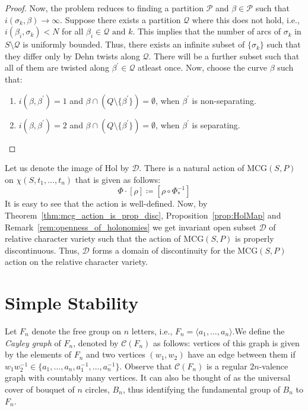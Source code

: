 \begin{proof}
	Now, the problem reduces to finding a partition $\mathcal{P}$ and $\beta \in \mathcal{P}$ such that $i(\sigma_k, \beta) \rightarrow \infty$. Suppose there exists a partition $\mathcal{Q}$ where this does not hold, i.e., $i(\beta_i,\sigma_k) < N$ for all $\beta_i \in \mathcal{Q} \text{ and } k$. This implies that the number of arcs of $\sigma_k$ in $S \setminus \mathcal{Q}$ is uniformly bounded. Thus, there exists an infinite subset of $\{\sigma_k\}$ such that they differ only by Dehn twists along $\mathcal{Q}$. There will be a further subset such that all of them are twisted along $\beta^\prime \in \mathcal{Q}$ atleast once. Now, choose the curve $\beta$ such that:
	\begin{enumerate}
		\item $i(\beta, \beta^\prime)=1$ and $\beta \cap \left(Q \setminus \{\beta^\prime\}\right) = \emptyset$, when $\beta^\prime$ is non-separating.
		\item $i(\beta, \beta^\prime)=2$ and $\beta \cap \left(Q \setminus \{\beta^\prime\}\right) = \emptyset$, when $\beta^\prime$ is separating.
	\end{enumerate}
\end{proof}

Let us denote the image of $\text{Hol}$ by $\mathcal{D}$. There is a natural action of $\text{MCG}(S,P)$ on $\chi(S,t_1,\ldots,t_n)$ that is given as follows:
\[\Phi \cdot [\rho] \coloneqq [\rho \circ \Phi_\ast^{-1}]\]
It is easy to see that the action is well-defined. Now, by Theorem~\ref{thm:mcg_action_is_prop_disc}, Proposition~\ref{prop:HolMap} and Remark~\ref{rem:openness_of_holonomies} we get invariant open subset $\mathcal{D}$ of relative character variety such that the action of $\text{MCG}(S,P)$ is properly discontinuous. Thus, $\mathcal{D}$ forms a domain of discontinuity for the $\text{MCG}(S,P)$ action on the relative character variety. 

\section{Simple Stability}

Let $F_n$ denote the free group on $n$ letters, i.e., $F_n = \langle a_1, \ldots, a_n \rangle$.We define the \textit{Cayley graph} of $F_n$, denoted by $\mathcal{C}(F_n)$ as follows: vertices of this graph is given by the elements of $F_n$ and two vertices $(w_1, w_2)$ have an edge between them if $w_1 w_2^{-1} \in \{a_1, \ldots,a_n,a_1^{-1},\ldots,a_n^{-1}\}$. Observe that $\mathcal{C}(F_n)$ is a regular $2n$-valence graph with countably many vertices. It can also be thought of as the universal cover of bouquet of $n$ circles, $B_n$, thus identifying the fundamental group of $B_n$ to $F_n$. 

